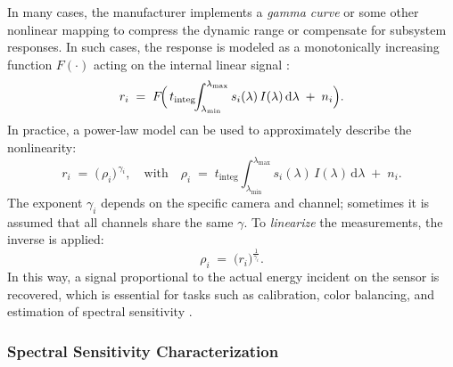 In many cases, the manufacturer implements a \emph{gamma curve} or some other nonlinear mapping to compress the dynamic range or compensate for subsystem responses. In such cases, the response is modeled as a monotonically increasing function $F(\cdot)$ acting on the internal linear signal \cite{Vora1997DigitalModels,Cheung2004AccurateCameras}:
\begin{equation}
r_{i} \;=\; F\!\Bigl(\,t_{\mathrm{integ}}\!\!\int_{\lambda_{\min}}^{\lambda_{\max}} s_{i}(\lambda)\,I(\lambda)\,\mathrm{d}\lambda \;+\; n_{i}\Bigr).
\label{eq:nonlinear_response}
\end{equation}
In practice, a power-law model can be used to approximately describe the nonlinearity:
\begin{equation}
r_{i} \;=\; \bigl(\,\rho_{i}\bigr)^{\,\gamma_{i}},
\quad
\text{with}
\quad
\rho_{i} \;=\; t_{\mathrm{integ}}\!\!\int_{\lambda_{\min}}^{\lambda_{\max}} s_{i}(\lambda)\,I(\lambda)\,\mathrm{d}\lambda \;+\; n_{i}.
\end{equation}
The exponent $\gamma_{i}$ depends on the specific camera and channel; sometimes it is assumed that all channels share the same $\gamma$. To \emph{linearize} the measurements, the inverse is applied:
\begin{equation}
\rho_{i} \;=\; \bigl(r_{i}\bigr)^{\frac{1}{\gamma_{i}}}.
\end{equation}
In this way, a signal proportional to the actual energy incident on the sensor is recovered, which is essential for tasks such as calibration, color balancing, and estimation of spectral sensitivity \cite{Cheung2004AccurateCameras,Uttner2006SpectralCameras}.

\subsubsection{Spectral Sensitivity Characterization}


